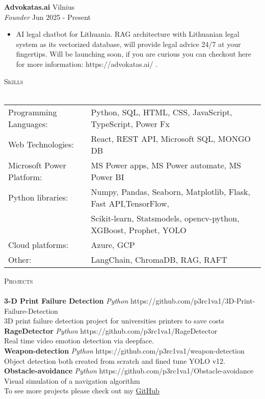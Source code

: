 \documentclass[a4paper]{article}
\newcommand{\lineunder} {
    \vspace*{-8pt} \\
    \hspace*{-18pt} \hrulefill \\
}
\newcommand{\header} [1] {
    {\hspace*{-18pt}\vspace*{6pt} \textsc{#1}}
    \vspace*{-6pt} \lineunder
}
\begin{document}
\textbf{Advokatas.ai} \hfill Vilnius\\
\textit{Founder} \hfill Jun 2025 - Present\\
\vspace{-1mm}
\begin{itemize} \itemsep 1pt
	\item AI legal chatbot for Lithuania. RAG architecture with Lithuanian legal system as its vectorized database, will provide legal advice 24/7 at your fingertips. Will be launching soon, if you are curious you can checkout here for more information: https://advokatas.ai/ .
\end{itemize}
\header{Skills}
\begin{tabular}{ l l }
	Programming Languages:    & Python, SQL, HTML, CSS, JavaScript, TypeScript, Power Fx       \\
	Web Technologies:         & React, REST API, Microsoft SQL, MONGO DB                       \\
	Microsoft Power Platform: & MS Power apps, MS Power automate, MS Power BI                  \\
	Python libraries:         & Numpy, Pandas, Seaborn, Matplotlib, Flask, Fast API,TensorFlow,\\ & Scikit-learn, Statsmodels, opencv-python, XGBoost, Prophet, YOLO \\
	Cloud platforms:          & Azure, GCP                                                     \\
    Other: & LangChain, ChromaDB, RAG, RAFT
\end{tabular}
\vspace{2mm}

\header{Projects}
{\textbf{3-D Print Failure Detection}} {\sl Python} \hfill https://github.com/p3rc1va1/3D-Print-Failure-Detection\\
3D print failure detection project for universities printers to save costs\\
\vspace*{2mm}
{\textbf{RageDetector}} {\sl Python} \hfill https://github.com/p3rc1va1/RageDetector\\
Real time video emotion detection via deepface.\\
\vspace*{2mm}
{\textbf{Weapon-detection}}   {\sl    Python} \hfill https://github.com/p3rc1va1/weapon-detection\\
Object detection both created from scratch and fined tune YOLO v12.\\
\vspace*{2mm}
{\textbf{Obstacle-avoidance}} {\sl Python} \hfill https://github.com/p3rc1va1/Obstacle-avoidance\\
Visual simulation of a navigation algorithm\\
To see more projects please check out my \href{https://github.com/p3rc1va1}{GitHub}
\ 
\end{document}
